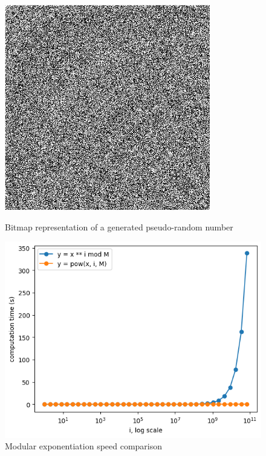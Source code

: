 \documentclass{article}
\begin{document}
\begin{figure}[h]
    \centering
    \begin{minipage}[t]{0.45\textwidth}
        \centering
        \includegraphics[width=0.8\textwidth]{img/bitmap_bbs.png}
        \caption{Bitmap representation of a generated pseudo-random number}
        \label{fig:bitmap_bbs}
    \end{minipage}\hfill
    \begin{minipage}[t]{0.45\textwidth}
        \centering
        \includegraphics[width=\textwidth]{img/pow_speed.png}
        \caption{Modular exponentiation speed comparison}
        \label{fig:pow_speed}
    \end{minipage}
\end{figure}
\end{document}
